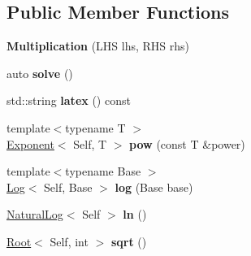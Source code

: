 \subsection*{\-Public \-Member \-Functions}
\begin{DoxyCompactItemize}
\item 
\hypertarget{classlatex_1_1math_1_1Multiplication_a01b926587f44a050634d8f79d7ff7714}{{\bfseries \-Multiplication} (\-L\-H\-S lhs, \-R\-H\-S rhs)}\label{classlatex_1_1math_1_1Multiplication_a01b926587f44a050634d8f79d7ff7714}

\item 
\hypertarget{classlatex_1_1math_1_1Multiplication_a29577e0e2321b539428a023ac60e360c}{auto {\bfseries solve} ()}\label{classlatex_1_1math_1_1Multiplication_a29577e0e2321b539428a023ac60e360c}

\item 
\hypertarget{classlatex_1_1math_1_1Multiplication_a658d8f7990c84934f66de6b604349f02}{std\-::string {\bfseries latex} () const }\label{classlatex_1_1math_1_1Multiplication_a658d8f7990c84934f66de6b604349f02}

\item 
\hypertarget{classlatex_1_1math_1_1Multiplication_a05b9c8ad4f130c5f82a169cdc7802c1d}{{\footnotesize template$<$typename T $>$ }\\\hyperlink{classlatex_1_1math_1_1Exponent}{\-Exponent}$<$ \-Self, \-T $>$ {\bfseries pow} (const \-T \&power)}\label{classlatex_1_1math_1_1Multiplication_a05b9c8ad4f130c5f82a169cdc7802c1d}

\item 
\hypertarget{classlatex_1_1math_1_1Multiplication_ae0ad97bbdf076e41566b2383d748edfb}{{\footnotesize template$<$typename Base $>$ }\\\hyperlink{classlatex_1_1math_1_1Log}{\-Log}$<$ \-Self, \-Base $>$ {\bfseries log} (\-Base base)}\label{classlatex_1_1math_1_1Multiplication_ae0ad97bbdf076e41566b2383d748edfb}

\item 
\hypertarget{classlatex_1_1math_1_1Multiplication_a33c4db51176ef8a04234a5ec27c05387}{\hyperlink{classlatex_1_1math_1_1NaturalLog}{\-Natural\-Log}$<$ \-Self $>$ {\bfseries ln} ()}\label{classlatex_1_1math_1_1Multiplication_a33c4db51176ef8a04234a5ec27c05387}

\item 
\hypertarget{classlatex_1_1math_1_1Multiplication_af67f7c4a1d4898681a87826a53b98099}{\hyperlink{classlatex_1_1math_1_1Root}{\-Root}$<$ \-Self, int $>$ {\bfseries sqrt} ()}\label{classlatex_1_1math_1_1Multiplication_af67f7c4a1d4898681a87826a53b98099}

\end{DoxyCompactItemize}
